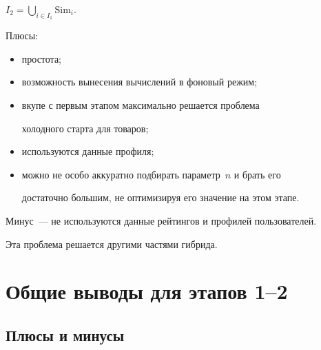 $I_2=\bigcup\limits_{i\in I_1} \mathrm{Sim}_i.$





Плюсы:


\begin{itemize} %


\item простота; 


\item возможность вынесения вычислений в фоновый режим; 


\item вкупе с первым этапом максимально решается проблема


холодного старта для товаров; 


\item используются данные профиля;


\item можно не особо аккуратно подбирать параметр~$n$ и брать его


достаточно большим, не оптимизируя его значение на этом этапе.


\end{itemize}





Минус~--- не используются данные рейтингов и профилей пользователей.


Эта проблема решается другими частями гибрида.





\section{Общие выводы для этапов 1--2}





\subsection{Плюсы и минусы}





